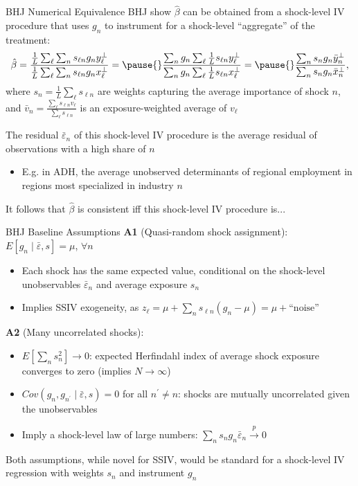 \documentclass{beamer}
\begin{document}
\begin{frame}{BHJ Numerical Equivalence}
\vspace{-0.2cm}
 BHJ show $\hat{\beta}$ can be obtained from a %
shock-level IV procedure that uses $g_n$ to instrument for a shock-level ``aggregate'' of the treatment:\pause{}
\begin{align*}
\hat{\beta}=\frac{\frac{1}{L}\sum_\ell \sum_n s_{\ell n} g_n y_\ell^\perp}{\frac{1}{L}\sum_\ell \sum_n s_{\ell n} g_n x_\ell^\perp}=\pause{}\frac{\sum_n g_n \sum_\ell\frac{1}{L}  s_{\ell n} y_\ell^\perp}{\sum_n g_n\sum_\ell\frac{1}{L}  s_{\ell n}  x_\ell^\perp}=\pause{}\frac{\sum_n s_n g_n \bar{y}_n^\perp}{\sum_n s_n g_n \bar{x}_n^\perp},
\end{align*}
where $s_n=\frac{1}{L}\sum_\ell s_{\ell n}$ are weights capturing the average importance of shock $n$, and $\bar{v}_n=\frac{\sum_\ell s_{\ell n} v_\ell}{\sum_\ell s_{\ell n}}$ is an exposure-weighted average of $v_\ell$\medskip\pause{}

The residual $\bar\varepsilon_n$ of this shock-level IV procedure is the average residual of observations with a high share of $n$\smallskip
	\begin{itemize}
	\item E.g. in ADH, the average unobserved determinants of regional employment in regions most specialized in industry $n$ \medskip\pause{}
	\end{itemize}
 It follows that $\hat{\beta}$ is consistent iff this shock-level IV procedure is...

\end{frame}

\begin{frame}{BHJ Baseline Assumptions}
\vspace{-0.3cm}
 \textbf{A1} (Quasi-random shock assignment): $E[g_n\mid\bar{\varepsilon},s]=\mu$, $\forall n$\smallskip
\begin{itemize}
\item Each shock has the same expected value, conditional on the shock-level unobservables $\bar{\varepsilon}_n$ and average exposure $s_n$\pause{}\smallskip
\item Implies SSIV exogeneity, as $z_\ell=\mu+\sum_n s_{\ell n}(g_n-\mu)=\mu+\text{``noise''}$ 
\end{itemize}\medskip\pause{}
 \textbf{A2} (Many uncorrelated shocks): \smallskip
\begin{itemize}
\item  $E\left[\sum_n s_n^2\right]\rightarrow 0$: expected Herfindahl index of average shock exposure converges to zero (implies $N\rightarrow \infty$)\smallskip
\item $Cov(g_n,g_{n^\prime}\mid\bar{\varepsilon},s)=0$ for all $n^\prime\ne n$: shocks are mutually uncorrelated given the unobservables\smallskip\pause{}
\item Imply a shock-level law of large numbers: $\sum_n s_n g_n\bar{\varepsilon}_n\xrightarrow{p} 0$
\end{itemize}\medskip\pause{}
 Both assumptions, while novel for SSIV, would be standard for a shock-level IV regression with weights $s_n$ and instrument $g_n$

\end{frame}
\end{document}
